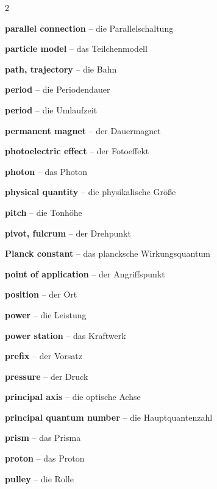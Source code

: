 \begin{multicols}{2}
\par\nopagebreak
\textbf{parallel connection} -- die Parallelschaltung\dotfill\hyperref[e:163]{\pageref*{e:163}}\par
\textbf{particle model} -- das Teilchenmodell\dotfill\hyperref[e:124]{\pageref*{e:124}}\par
\textbf{path, trajectory} -- die Bahn\dotfill\hyperref[e:33]{\pageref*{e:33}}\par
\textbf{period} -- die Periodendauer\dotfill\hyperref[e:196]{\pageref*{e:196}}\par
\textbf{period} -- die Umlaufzeit\dotfill\hyperref[e:51]{\pageref*{e:51}}\par
\textbf{permanent magnet} -- der Dauermagnet\dotfill\hyperref[e:175]{\pageref*{e:175}}\par
\textbf{photoelectric effect} -- der Fotoeffekt\dotfill\hyperref[e:293]{\pageref*{e:293}}\par
\textbf{photon} -- das Photon\dotfill\hyperref[e:291]{\pageref*{e:291}}\par
\textbf{physical quantity} -- die physikalische Größe\dotfill\hyperref[e:1]{\pageref*{e:1}}\par
\textbf{pitch} -- die Tonhöhe\dotfill\hyperref[e:214]{\pageref*{e:214}}\par
\textbf{pivot, fulcrum} -- der Drehpunkt\dotfill\hyperref[e:84]{\pageref*{e:84}}\par
\textbf{Planck constant} -- das plancksche Wirkungsquantum\dotfill\hyperref[e:292]{\pageref*{e:292}}\par
\textbf{point of application} -- der Angriffspunkt\dotfill\hyperref[e:60]{\pageref*{e:60}}\par
\textbf{position} -- der Ort\dotfill\hyperref[e:34]{\pageref*{e:34}}\par
\textbf{power} -- die Leistung\dotfill\hyperref[e:105]{\pageref*{e:105}}\par
\textbf{power station} -- das Kraftwerk\dotfill\hyperref[e:111]{\pageref*{e:111}}\par
\textbf{prefix} -- der Vorsatz\dotfill\hyperref[e:7]{\pageref*{e:7}}\par
\textbf{pressure} -- der Druck\dotfill\hyperref[e:89]{\pageref*{e:89}}\par
\textbf{principal axis} -- die optische Achse\dotfill\hyperref[e:243]{\pageref*{e:243}}\par
\textbf{principal quantum number} -- die Hauptquantenzahl\dotfill\hyperref[e:295]{\pageref*{e:295}}\par
\textbf{prism} -- das Prisma\dotfill\hyperref[e:254]{\pageref*{e:254}}\par
\textbf{proton} -- das Proton\dotfill\hyperref[e:263]{\pageref*{e:263}}\par
\textbf{pulley} -- die Rolle\dotfill\hyperref[e:86]{\pageref*{e:86}}\par


\end{multicols}
